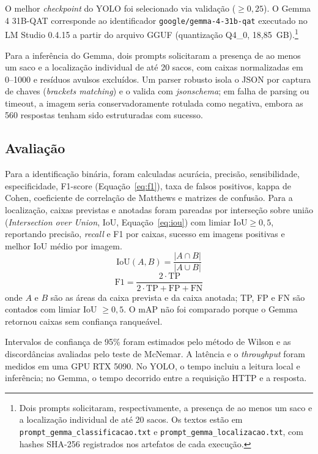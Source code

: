 \documentclass[kdmile,a4paper]{kdmile}
\begin{document}
O melhor \emph{checkpoint} do YOLO foi selecionado via validação ($\ge 0{,}25$). O Gemma 4 31B-QAT corresponde ao identificador \texttt{google/gemma-4-31b-qat} executado no LM Studio 0.4.15 a partir do arquivo GGUF  (quantização Q4\_0, 18,85~GB).\footnote{Dois prompts solicitaram, respectivamente, a presença de ao menos um saco e a localização individual de até 20 sacos. Os textos estão em \texttt{prompt\_gemma\_classificacao.txt} e \texttt{prompt\_gemma\_localizacao.txt}, com hashes SHA-256 registrados nos artefatos de cada execução.}

Para a inferência do Gemma, dois prompts solicitaram a presença de ao menos um saco e a localização individual de até 20 sacos, com caixas normalizadas em 0--1000 e resíduos avulsos excluídos. Um parser robusto isola o JSON por captura de chaves (\emph{brackets matching}) e o valida com \emph{jsonschema}; em falha de parsing ou timeout, a imagem seria conservadoramente rotulada como negativa, embora as 560 respostas tenham sido estruturadas com sucesso.

\subsection{Avaliação}
\label{sec:avaliacao}

Para a identificação binária, foram calculadas acurácia, precisão, sensibilidade, especificidade, F1-score (Equação~\ref{eq:f1}), taxa de falsos positivos, kappa de Cohen, coeficiente de correlação de Matthews e matrizes de confusão. Para a localização, caixas previstas e anotadas foram pareadas por interseção sobre união (\emph{Intersection over Union}, IoU, Equação~\ref{eq:iou}) com limiar $\mathrm{IoU} \ge 0{,}5$, reportando precisão, \emph{recall} e F1 por caixas, sucesso em imagens positivas e melhor IoU médio por imagem.
\begin{equation}
\mathrm{IoU}(A,B) = \frac{|A \cap B|}{|A \cup B|}
\label{eq:iou}
\end{equation}
\begin{equation}
\mathrm{F1} = \frac{2 \cdot \mathrm{TP}}{2 \cdot \mathrm{TP} + \mathrm{FP} + \mathrm{FN}}
\label{eq:f1}
\end{equation}
\noindent onde $A$ e $B$ são as áreas da caixa prevista e da caixa anotada; TP, FP e FN são contados com limiar IoU $\ge 0{,}5$. O mAP não foi comparado porque o Gemma retornou caixas sem confiança ranqueável.

Intervalos de confiança de 95\% foram estimados pelo método de Wilson e as discordâncias avaliadas pelo teste de McNemar. A latência e o \emph{throughput} foram medidos em uma GPU RTX 5090. No YOLO, o tempo incluiu a leitura local e inferência; no Gemma, o tempo decorrido entre a requisição HTTP e a resposta.
\end{document}
